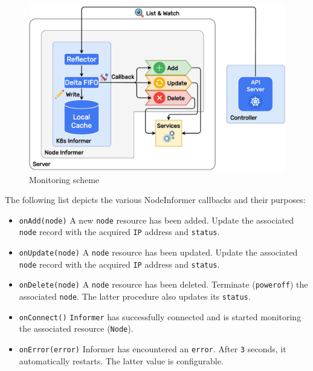 \begin{figure}[htbp]
  \centering
  \includegraphics[width=.75\textwidth]{images/implementation/informer.pdf}
  \caption{Monitoring scheme}
  \label{fig:informer}
\end{figure}

The following list depicts the various NodeInformer callbacks and their purposes:
\begin{itemize}
  \item \texttt{onAdd(node)}
    \newline
    A new \texttt{node} resource has been added.
    \newline
    Update the associated \texttt{node} record with the acquired \texttt{IP} address
    and \texttt{status}.

  \item \texttt{onUpdate(node)}
    \newline
    A \texttt{node} resource has been updated.
    \newline
    Update the associated \texttt{node} record with the acquired \texttt{IP} address
    and \texttt{status}.

  \item \texttt{onDelete(node)}
    \newline
    A \texttt{node} resource has been deleted.
    \newline
    Terminate (\texttt{poweroff}) the associated \texttt{node}. The latter
    procedure also updates its \texttt{status}.

  \item \texttt{onConnect()}
    \newline
    \texttt{Informer} has successfully connected and is started monitoring the associated
    resource (\texttt{Node}).

  \item \texttt{onError(error)}
    \newline
    Informer has encountered an \texttt{error}.
    \newline
    After \texttt{3} seconds, it automatically restarts. The latter value is
    configurable.
\end{itemize}

